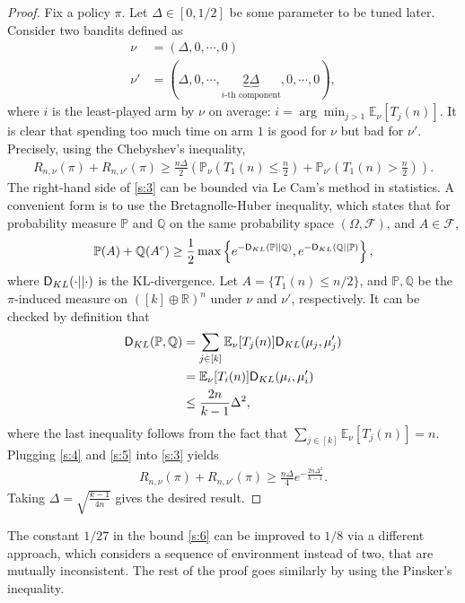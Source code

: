 \documentclass[10pt,a4article]{amsart}
\numberwithin{equation}{section}
\theoremstyle{plain}
\theoremstyle{definition}
\def\R{{\mathbb R}}
\def\Q{{\mathbb Q}}
\def\E{{\mathbb E}}
\def\R{{\mathbb R}}
\def\P{{\mathbb P}}
\begin{document}
\begin{proof}
Fix a policy $\pi$. Let $\Delta\in [0, 1/2]$ be some parameter to be tuned later. Consider two bandits defined as
\begin{align*}
\nu &= (\Delta, 0, \cdots, 0)\\
\nu' &= (\Delta, 0, \cdots, \underbrace{2\Delta}_{\text{$i$-th component}}, 0, \cdots, 0),
\end{align*}
where $i$ is the least-played arm by $\nu$ on average: $i=\arg\min_{j>1}\E_\nu[T_j(n)]$. It is clear that spending too much time on arm $1$ is good for $\nu$ but bad for $\nu'$. Precisely, using the Chebyshev's inequality,
\begin{align}
R_{n, \nu}(\pi)+R_{n, \nu'}(\pi)\geq \frac{n\Delta}{2}\left(\P_\nu\left(T_1(n)\leq \frac{n}{2}\right)+\P_{\nu'}\left(T_1(n)> \frac{n}{2}\right)\right).\label{s:3}
\end{align}
The right-hand side of \eqref{s:3} can be bounded via Le Cam's method in statistics. A convenient form is to use the Bretagnolle-Huber inequality, which states that for probability measure $\P$ and $\Q$ on the same probability space $(\Omega, \mathcal{F})$, and $A\in\mathcal{F}$, 
\begin{align}
\P(A)+\Q(A^c)\geq\frac{1}{2}\max\left\{e^{-\textsf D_{KL}(\P||\Q)}, e^{-\textsf D_{KL}(\Q|| \P)}\right\},\label{s:4}
\end{align}
where $\textsf D_{KL}(\cdot || \cdot)$ is the KL-divergence. Let $A = \{T_1(n)\leq n/2\}$, and $\P, \Q$ be the $\pi$-induced measure on $([k]\oplus\R)^n$ under $\nu$ and $\nu'$, respectively. It can be checked by definition that 
\begin{align}
\textsf D_{KL}(\P, \Q)& = \sum_{j\in [k]}\E_\nu[T_j(n)]\textsf D_{KL}(\mu_j, \mu'_j)\label{s:5}\\
& = \E_\nu[T_i(n)]\textsf D_{KL}(\mu_i, \mu'_i)\nonumber\\
& \leq\frac{2n}{k-1}\Delta^2\nonumber,
\end{align}
where the last inequality follows from the fact that $\sum_{j\in [k]}\E_\nu[T_j(n)]=n$. Plugging \eqref{s:4} and \eqref{s:5} into \eqref{s:3} yields
\begin{align*}
R_{n, \nu}(\pi)+R_{n, \nu'}(\pi)\geq\frac{n\Delta}{4}e^{-\frac{2n\Delta^2}{k-1}}. 
\end{align*}
Taking $\Delta = \sqrt{\frac{k-1}{4n}}$ gives the desired result. 
\end{proof}
The constant $1/27$ in the bound \eqref{s:6} can be improved to $1/8$ via a different approach, which considers a sequence of environment instead of two, that are mutually inconsistent. The rest of the proof goes similarly by using the Pinsker's inequality.   
\end{document}
